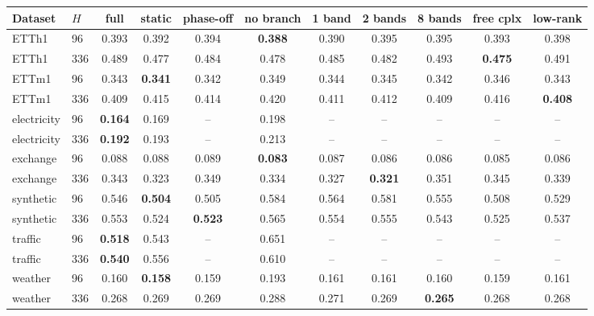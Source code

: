 \begin{tabular}{llccccccccc}
\toprule
Dataset & $H$ & full & static & phase-off & no branch & 1 band & 2 bands & 8 bands & free cplx & low-rank \\
\midrule
ETTh1 & 96 & 0.393 & 0.392 & 0.394 & \textbf{0.388} & 0.390 & 0.395 & 0.395 & 0.393 & 0.398 \\
ETTh1 & 336 & 0.489 & 0.477 & 0.484 & 0.478 & 0.485 & 0.482 & 0.493 & \textbf{0.475} & 0.491 \\
ETTm1 & 96 & 0.343 & \textbf{0.341} & 0.342 & 0.349 & 0.344 & 0.345 & 0.342 & 0.346 & 0.343 \\
ETTm1 & 336 & 0.409 & 0.415 & 0.414 & 0.420 & 0.411 & 0.412 & 0.409 & 0.416 & \textbf{0.408} \\
electricity & 96 & \textbf{0.164} & 0.169 & -- & 0.198 & -- & -- & -- & -- & -- \\
electricity & 336 & \textbf{0.192} & 0.193 & -- & 0.213 & -- & -- & -- & -- & -- \\
exchange & 96 & 0.088 & 0.088 & 0.089 & \textbf{0.083} & 0.087 & 0.086 & 0.086 & 0.085 & 0.086 \\
exchange & 336 & 0.343 & 0.323 & 0.349 & 0.334 & 0.327 & \textbf{0.321} & 0.351 & 0.345 & 0.339 \\
synthetic & 96 & 0.546 & \textbf{0.504} & 0.505 & 0.584 & 0.564 & 0.581 & 0.555 & 0.508 & 0.529 \\
synthetic & 336 & 0.553 & 0.524 & \textbf{0.523} & 0.565 & 0.554 & 0.555 & 0.543 & 0.525 & 0.537 \\
traffic & 96 & \textbf{0.518} & 0.543 & -- & 0.651 & -- & -- & -- & -- & -- \\
traffic & 336 & \textbf{0.540} & 0.556 & -- & 0.610 & -- & -- & -- & -- & -- \\
weather & 96 & 0.160 & \textbf{0.158} & 0.159 & 0.193 & 0.161 & 0.161 & 0.160 & 0.159 & 0.161 \\
weather & 336 & 0.268 & 0.269 & 0.269 & 0.288 & 0.271 & 0.269 & \textbf{0.265} & 0.268 & 0.268 \\
\bottomrule
\end{tabular}